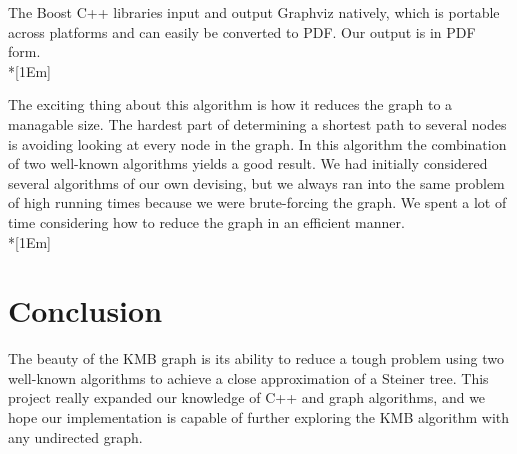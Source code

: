\documentclass[titlepage,twoside,openright,12pt]{article}
\begin{document}
\begin{raggedright}
The Boost C++ libraries input and output Graphviz natively, which is portable 
across platforms and can easily be converted to PDF. Our output is in PDF form.\\*[1Em]

The exciting thing about this algorithm is how it reduces the graph to a managable
size. The hardest part of determining a shortest path to several nodes is avoiding
looking at every node in the graph. In this algorithm the combination of two well-known 
algorithms yields a good result. We had initially considered several 
algorithms of our own devising, but we always ran into the same problem of high
running times because we were brute-forcing the graph. We spent a lot of time
considering how to reduce the graph in an efficient manner.\\*[1Em]

\section*{Conclusion}
The beauty of the KMB graph is its ability to reduce a tough problem using two
well-known algorithms to achieve a close approximation of a Steiner tree. This 
project really expanded our knowledge of C++ and graph algorithms, and we hope our
implementation is capable of further exploring the KMB algorithm with any undirected
graph.

\end{raggedright}
\nocite{ks:pzh}


\end{document}
